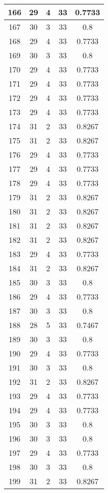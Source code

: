\documentclass[letterpaper, 12pt]{article}
\begin{document}
\begin{longtable}{|c|c|c|c|c|}
\hline
166 & 29 & 4 & 33 & 0.7733 \\
\hline
167 & 30 & 3 & 33 & 0.8 \\
\hline
168 & 29 & 4 & 33 & 0.7733 \\
\hline
169 & 30 & 3 & 33 & 0.8 \\
\hline
170 & 29 & 4 & 33 & 0.7733 \\
\hline
171 & 29 & 4 & 33 & 0.7733 \\
\hline
172 & 29 & 4 & 33 & 0.7733 \\
\hline
173 & 29 & 4 & 33 & 0.7733 \\
\hline
174 & 31 & 2 & 33 & 0.8267 \\
\hline
175 & 31 & 2 & 33 & 0.8267 \\
\hline
176 & 29 & 4 & 33 & 0.7733 \\
\hline
177 & 29 & 4 & 33 & 0.7733 \\
\hline
178 & 29 & 4 & 33 & 0.7733 \\
\hline
179 & 31 & 2 & 33 & 0.8267 \\
\hline
180 & 31 & 2 & 33 & 0.8267 \\
\hline
181 & 31 & 2 & 33 & 0.8267 \\
\hline
182 & 31 & 2 & 33 & 0.8267 \\
\hline
183 & 29 & 4 & 33 & 0.7733 \\
\hline
184 & 31 & 2 & 33 & 0.8267 \\
\hline
185 & 30 & 3 & 33 & 0.8 \\
\hline
186 & 29 & 4 & 33 & 0.7733 \\
\hline
187 & 30 & 3 & 33 & 0.8 \\
\hline
188 & 28 & 5 & 33 & 0.7467 \\
\hline
189 & 30 & 3 & 33 & 0.8 \\
\hline
190 & 29 & 4 & 33 & 0.7733 \\
\hline
191 & 30 & 3 & 33 & 0.8 \\
\hline
192 & 31 & 2 & 33 & 0.8267 \\
\hline
193 & 29 & 4 & 33 & 0.7733 \\
\hline
194 & 29 & 4 & 33 & 0.7733 \\
\hline
195 & 30 & 3 & 33 & 0.8 \\
\hline
196 & 30 & 3 & 33 & 0.8 \\
\hline
197 & 29 & 4 & 33 & 0.7733 \\
\hline
198 & 30 & 3 & 33 & 0.8 \\
\hline
199 & 31 & 2 & 33 & 0.8267 \\
\hline
\end{longtable}
\end{document}
